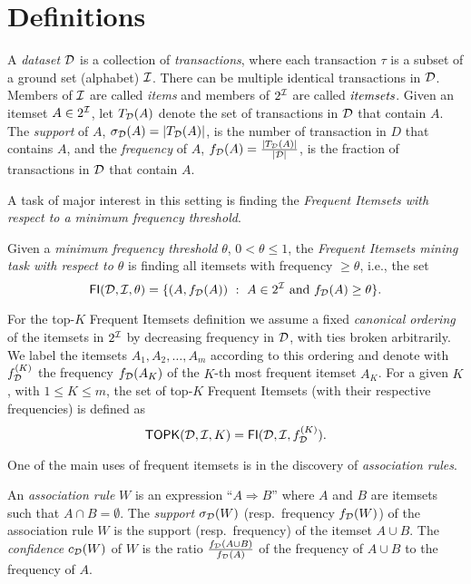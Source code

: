 \section{Definitions}
\label{sec:parmadef}

A \emph{dataset} ${\cal D}$ is a collection of \emph{transactions}, where each
transaction $\tau$ is a subset of a ground set (alphabet) ${\cal I}$. There can
be multiple identical transactions in ${\cal D}$. Members of ${\cal I}$ are called
\emph{items} and members of $2^{\cal I}$ are called $\emph{itemsets}$.
Given an itemset
$A \in 2^{{\cal I}}$,  let $T_{\cal D}(A)$ denote the set of
transactions in ${\cal D}$ that contain $A$. The \emph{support} of $A$,
$\sigma_{\cal D}(A) =|T_{\cal D}(A)|$, is the number of transaction in $D$ that contains
$A$, and the \emph{frequency} of $A$, $f_{\cal D}(A)= \frac{|T_{\cal D}(A)|}{|{\cal D}|}$, is the fraction of
transactions in ${\cal D}$ that contain $A$.

A task of major interest in this setting is finding the \emph{Frequent
Itemsets with respect to a minimum frequency threshold}.

\begin{definition}\label{def:parmaminethreshold}
  Given a \emph{minimum frequency threshold} $\theta$, $0<\theta\le 1$, the 
  \emph{Frequent Itemsets mining task with respect to $\theta$} is finding all itemsets with
  frequency $\geq\theta$, i.e., the set
  \[
\mathsf{FI}({\cal D},{\cal I},\theta)=\{(A,f_{\cal D}(A)) ~:~ A \in 2^{\cal I} \mbox{ and } f_{{\cal D}}(A)\ge
\theta\}.
\] 
\end{definition}

For the top-$K$ Frequent Itemsets definition we assume a fixed \textit{canonical ordering} of
the itemsets in $2^{\cal I}$ by decreasing frequency in ${\cal D}$, with ties broken
arbitrarily. We label the itemsets $A_1,A_2,\dotsc,A_m$ according
to this ordering and denote with $f^{(K)}_{\cal D}$ the frequency $f_{\cal D}(A_K)$ of
the $K$-th most frequent itemset $A_K$. For a given $K$, with $1 \leq K \leq m$,
the set of top-$K$ Frequent Itemsets (with their respective frequencies) is
defined as
  \begin{equation}\label{eq:parmatopkdef}
    \mathsf{TOPK}({\cal D},{\cal I},K)= \mathsf{FI}({\cal D},{\cal I},f^{(K)}_{\cal D}).
  \end{equation}

One of the main uses of frequent itemsets is in the discovery of
\emph{association rules}.

\begin{definition}\label{def:parmaar}
  An \emph{association rule} $W$ is an expression ``$A\Rightarrow B$'' where $A$
  and $B$ are itemsets such that $A\cap B=\emptyset$. The \emph{support}
  $\sigma_{\cal D}(W)$ (resp.~frequency $f_{\cal D}(W)$) of the association rule
  $W$ is the support (resp.~frequency) of the
  itemset $A\cup B$. The \emph{confidence} $c_{\cal D}(W)$ of $W$ is the ratio
  $\frac{f_{\cal D}(A \cup B)}{f_{\cal D}(A)}$ of the frequency of $A\cup B$ to the
  frequency of $A$. 
\end{definition}

